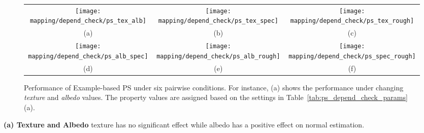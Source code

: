 \begin{sidewaysfigure}[!htbp]
\begin{tabular}{ccc}
\texttt{[image: mapping/depend\_check/ps\_tex\_alb]}&
\texttt{[image: mapping/depend\_check/ps\_tex\_spec]}&
\texttt{[image: mapping/depend\_check/ps\_tex\_rough]}\\
(a) & (b) &(c)\\
\texttt{[image: mapping/depend\_check/ps\_alb\_spec]}&
\texttt{[image: mapping/depend\_check/ps\_alb\_rough]}&
\texttt{[image: mapping/depend\_check/ps\_spec\_rough]}\\
(d) & (e) & (f)\\
\end{tabular}
\caption{Performance of Example-based PS under six pairwise conditions. For instance, (a) shows the performance under changing \textit{texture} and \textit{albedo} values. The property values are assigned based on the settings in Table~\ref{tab:ps_depend_check_params} (a).}
\label{fig:ps_depend_check}
\end{sidewaysfigure}

\textbf{(a) Texture and Albedo} 
texture has no significant effect while albedo has a positive effect on normal estimation.

